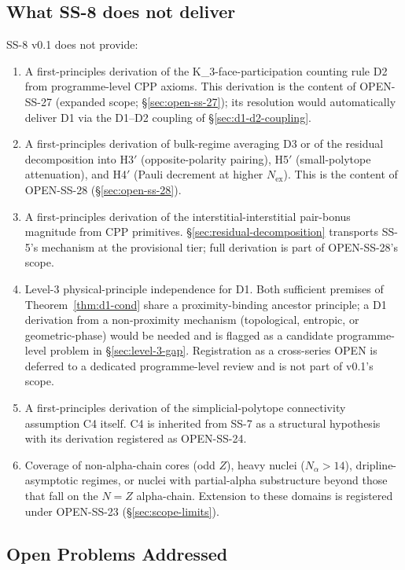 \documentclass[11pt,letterpaper]{article}
\theoremstyle{definition}
\newcommand{\Nalpha}{N_\alpha}
\newcommand{\Nex}{N_{\text{ex}}}
\newcommand{\Kthree}{K_3}
\begin{document}
\subsection{What SS-8 does not deliver}
\label{sec:non-deliverables}

SS-8 v0.1 does not provide:

\begin{enumerate}
  \item A first-principles derivation of the \Kthree-face-participation counting rule D2 from programme-level CPP axioms. This derivation is the content of OPEN-SS-27 (expanded scope; \S\ref{sec:open-ss-27}); its resolution would automatically deliver D1 via the D1--D2 coupling of \S\ref{sec:d1-d2-coupling}.
  \item A first-principles derivation of bulk-regime averaging D3 or of the residual decomposition into H3$'$ (opposite-polarity pairing), H5$'$ (small-polytope attenuation), and H4$'$ (Pauli decrement at higher $\Nex$). This is the content of OPEN-SS-28 (\S\ref{sec:open-ss-28}).
  \item A first-principles derivation of the interstitial-interstitial pair-bonus magnitude from CPP primitives. \S\ref{sec:residual-decomposition} transports SS-5's mechanism at the provisional tier; full derivation is part of OPEN-SS-28's scope.
  \item Level-3 physical-principle independence for D1. Both sufficient premises of Theorem~\ref{thm:d1-cond} share a proximity-binding ancestor principle; a D1 derivation from a non-proximity mechanism (topological, entropic, or geometric-phase) would be needed and is flagged as a candidate programme-level problem in \S\ref{sec:level-3-gap}. Registration as a cross-series OPEN is deferred to a dedicated programme-level review and is not part of v0.1's scope.
  \item A first-principles derivation of the simplicial-polytope connectivity assumption C4 itself. C4 is inherited from SS-7 as a structural hypothesis with its derivation registered as OPEN-SS-24.
  \item Coverage of non-alpha-chain cores (odd $Z$), heavy nuclei ($\Nalpha > 14$), dripline-asymptotic regimes, or nuclei with partial-alpha substructure beyond those that fall on the $N = Z$ alpha-chain. Extension to these domains is registered under OPEN-SS-23 (\S\ref{sec:scope-limits}).
\end{enumerate}

\subsection{Open Problems Addressed}
\label{sec:open-problems-addressed}
\end{document}
